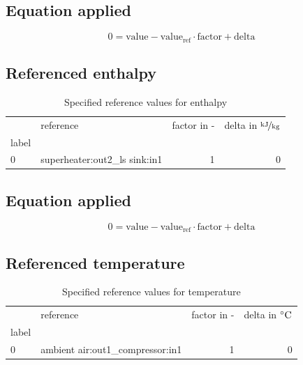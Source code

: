 \documentclass[]{article}
\begin{document}
\subsection{Equation applied}

\begin{equation}
\label{eq:Connection_ref}
0 = \text{value} - \text{value}_\mathrm{ref} \cdot \mathrm{factor} + \text{delta}
\end{equation}

\subsection{Referenced enthalpy}

\begin{table}[H]
\centering
\caption{Specified reference values for enthalpy}
\begin{tabular}{llrr}
\toprule
{} &                      reference &  factor in - &  delta in $\unitfrac[]{kJ}{kg}$ \\
label &                                &              &                                 \\
\midrule
0     &  superheater:out2\_ls sink:in1 &            1 &                               0 \\
\bottomrule
\end{tabular}
\end{table}
\subsection{Equation applied}

\begin{equation}
\label{eq:Connection_ref}
0 = \text{value} - \text{value}_\mathrm{ref} \cdot \mathrm{factor} + \text{delta}
\end{equation}

\subsection{Referenced temperature}

\begin{table}[H]
\centering
\caption{Specified reference values for temperature}
\begin{tabular}{llrr}
\toprule
{} &                         reference &  factor in - &  delta in $\unit[]{^\circ C}$ \\
label &                                   &              &                               \\
\midrule
0     &  ambient air:out1\_compressor:in1 &            1 &                             0 \\
\bottomrule
\end{tabular}
\end{table}
\end{document}
